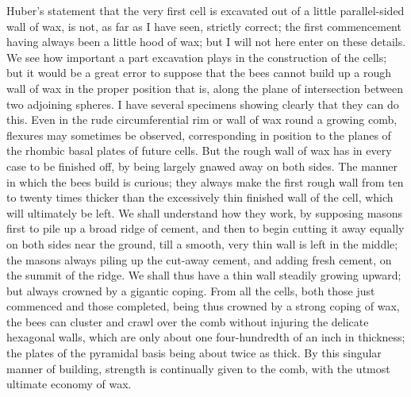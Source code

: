 \indent Huber's statement that the very first cell is excavated out of a little parallel-sided wall of wax, is not, as far as I have seen, strictly correct; the first commencement having always been a little hood of wax; but I will not here enter on these details. We see how important a part excavation plays in the construction of the cells; but it would be a great error to suppose that the bees cannot build up a rough wall of wax in the proper position that is, along the plane of intersection between two adjoining spheres. I have several specimens showing clearly that they can do this. Even in the rude circumferential rim or wall of wax round a growing comb, flexures may sometimes be observed, corresponding in position to the planes of the rhombic basal plates of future cells. But the rough wall of wax has in every case to be finished off, by being largely gnawed away on both sides. The manner in which the bees build is curious; they always make the first rough wall from ten to twenty times thicker than the excessively thin finished wall of the cell, which will ultimately be left. We shall understand how they work, by supposing masons first to pile up a broad ridge of cement, and then to begin cutting it away equally on both sides near the ground, till a smooth, very thin wall is left in the middle; the masons always piling up the cut-away cement, and adding fresh cement, on the summit of the ridge. We shall thus have a thin wall steadily growing upward; but always crowned by a gigantic coping. From all the cells, both those just commenced and those completed, being thus crowned by a strong coping of wax, the bees can cluster and crawl over the comb without injuring the delicate hexagonal walls, which are only about one four-hundredth of an inch in thickness; the plates of the pyramidal basis being about twice as thick. By this singular manner of building, strength is continually given to the comb, with the utmost ultimate economy of wax.\\

